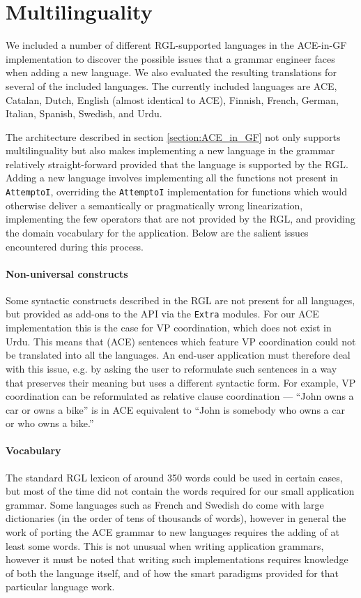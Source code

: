 \documentclass[a4paper]{article}
\begin{document}
\section{Multilinguality}
\label{section:Multilinguality}

We included a number of different RGL-supported languages in the ACE-in-GF
implementation to discover the possible issues that a grammar engineer faces
when adding a new language. We also evaluated the resulting
translations for several of the included languages.
The currently included languages are
ACE,
Catalan,
Dutch,
English (almost identical to ACE),
Finnish,
French,
German,
Italian,
Spanish,
Swedish, and
Urdu.

The architecture described in section \ref{section:ACE_in_GF} not only
supports multilinguality but also makes implementing a new language in
the grammar relatively straight-forward provided that the language is
supported by the RGL. Adding a new language involves implementing all
the functions not present in \texttt{AttemptoI}, overriding the
\texttt{AttemptoI} implementation for functions which would otherwise
deliver a semantically or pragmatically wrong linearization,
implementing the few operators that are not provided by the RGL, and
providing the domain vocabulary for the application. Below are the
salient issues encountered during this process.

\paragraph{Non-universal constructs}
Some syntactic constructs described in the RGL are not present for all
languages, but provided as add-ons to the API via the \verb|Extra|
modules.  For our ACE implementation this is the case for VP
coordination, which does not exist in Urdu. This means that (ACE)
sentences which feature VP coordination could not be translated into
all the languages. An end-user application must therefore deal with
this issue, e.g. by asking the user to reformulate such sentences in a
way that preserves their meaning but uses a different syntactic
form. For example, VP coordination can be reformulated as relative
clause coordination --- ``John owns a car or owns a bike'' is in ACE
equivalent to ``John is somebody who owns a car or who owns a bike.''

\paragraph{Vocabulary}
The standard RGL lexicon of around 350 words could be used in certain
cases, but most of the time did not contain the words required for our
small application grammar. Some languages such as French and Swedish
do come with large dictionaries (in the order of tens of thousands of
words), however in general the work of porting the ACE grammar to new
languages requires the adding of at least some words. This is not
unusual when writing application grammars, however it must be noted
that writing such implementations requires knowledge of both the
language itself, and of how the smart paradigms provided for that
particular language work.
\end{document}
